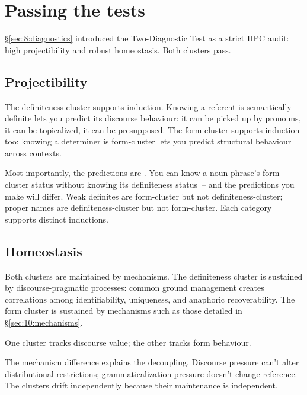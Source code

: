 \section{Passing the tests}
\label{sec:10:tests}

§\ref{sec:8:diagnostics} introduced the Two-Diagnostic Test as a strict HPC audit: high projectibility and robust homeostasis. Both clusters pass.

\subsection{Projectibility}
\label{sec:10:projectibility}

The definiteness cluster supports induction. Knowing a referent is semantically definite lets you predict its discourse behaviour: it can be picked up by pronouns, it can be topicalized, it can be presupposed. The form cluster supports induction too: knowing a determiner is form-cluster lets you predict structural behaviour across contexts.

Most importantly, the predictions are . You can know a noun phrase's form-cluster status without knowing its definiteness status~-- and the predictions you make will differ. Weak definites are form-cluster but not definiteness-cluster; proper names are definiteness-cluster but not form-cluster. Each category supports distinct inductions.

\subsection{Homeostasis}
\label{sec:10:homeostasis}

Both clusters are maintained by mechanisms. The definiteness cluster is sustained by discourse-pragmatic processes: common ground management creates correlations among identifiability, uniqueness, and anaphoric recoverability. The form cluster is sustained by mechanisms such as those detailed in §\ref{sec:10:mechanisms}.

One cluster tracks discourse value; the other tracks form behaviour.

The mechanism difference explains the decoupling. Discourse pressure can't alter distributional restrictions; grammaticalization pressure doesn't change reference. The clusters drift independently because their maintenance is independent.


